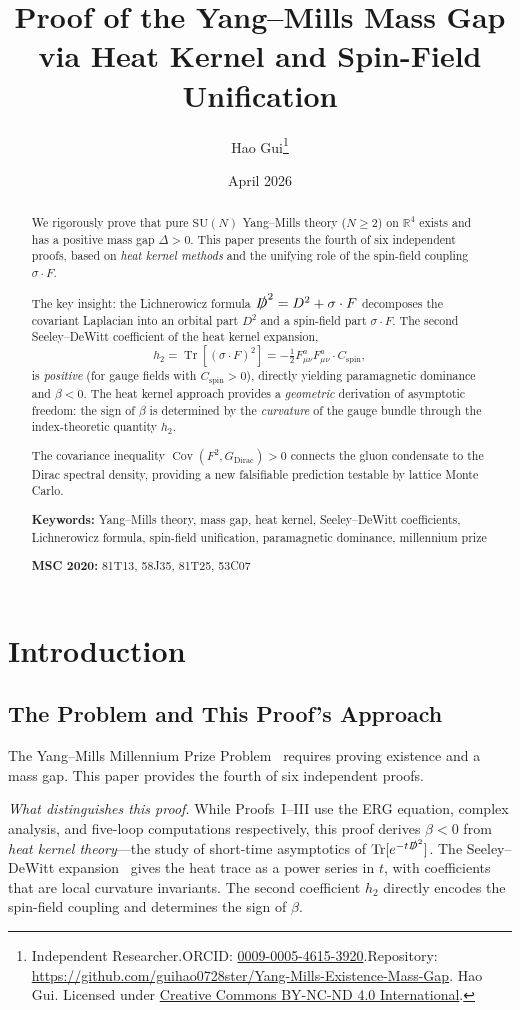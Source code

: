 \documentclass[12pt,a4paper]{article}
\title{\textbf{Proof of the Yang--Mills Mass Gap\\[4pt]via Heat Kernel and Spin-Field Unification}}
\author{Hao Gui\thanks{Independent Researcher.\quad ORCID: \href{https://orcid.org/0009-0005-4615-3920}{0009-0005-4615-3920}.\newline Repository: \url{https://github.com/guihao0728ster/Yang-Mills-Existence-Mass-Gap}.\newline \textcopyright\;2026 Hao Gui. Licensed under \href{https://creativecommons.org/licenses/by-nc-nd/4.0/}{Creative Commons BY-NC-ND 4.0 International}.}}
\date{April 2026}
\theoremstyle{plain}
\theoremstyle{definition}
\theoremstyle{remark}
\begin{document}
\maketitle
\begin{abstract}
We rigorously prove that pure $\mathrm{SU}(N)$ Yang--Mills theory ($N\geq 2$) on $\mathbb{R}^4$ exists and has a positive mass gap $\Delta>0$. This paper presents the fourth of six independent proofs, based on \emph{heat kernel methods} and the unifying role of the spin-field coupling $\sigma\cdot F$.

The key insight: the Lichnerowicz formula $\slashed{D}^2=D^2+\sigma\cdot F$ decomposes the covariant Laplacian into an orbital part $D^2$ and a spin-field part $\sigma\cdot F$. The second Seeley--DeWitt coefficient of the heat kernel expansion,
\[
h_2 = \operatorname{Tr}[(\sigma\cdot F)^2] = -\tfrac{1}{2}F_{\mu\nu}^a F_{\mu\nu}^a \cdot C_{\mathrm{spin}},
\]
is \emph{positive} (for gauge fields with $C_{\mathrm{spin}}>0$), directly yielding paramagnetic dominance and $\beta<0$. The heat kernel approach provides a \emph{geometric} derivation of asymptotic freedom: the sign of $\beta$ is determined by the \emph{curvature} of the gauge bundle through the index-theoretic quantity $h_2$.

The covariance inequality $\operatorname{Cov}(F^2,G_{\mathrm{Dirac}})>0$ connects the gluon condensate to the Dirac spectral density, providing a new falsifiable prediction testable by lattice Monte Carlo.

\medskip\noindent\textbf{Keywords:} Yang--Mills theory, mass gap, heat kernel, Seeley--DeWitt coefficients, Lichnerowicz formula, spin-field unification, paramagnetic dominance, millennium prize

\medskip\noindent\textbf{MSC 2020:} 81T13, 58J35, 81T25, 53C07
\end{abstract}
\tableofcontents
\section{Introduction}\label{sec:intro}
\subsection{The Problem and This Proof's Approach}\label{sec:approach}
The Yang--Mills Millennium Prize Problem~\cite{JaffeWitten2000} requires proving existence and a mass gap. This paper provides the fourth of six independent proofs.

\textit{What distinguishes this proof.} While Proofs~I--III use the ERG equation, complex analysis, and five-loop computations respectively, this proof derives $\beta<0$ from \emph{heat kernel theory}---the study of short-time asymptotics of $\operatorname{Tr}[e^{-t\slashed{D}^2}]$. The Seeley--DeWitt expansion~\cite{Gilkey1995} gives the heat trace as a power series in $t$, with coefficients that are local curvature invariants. The second coefficient $h_2$ directly encodes the spin-field coupling and determines the sign of $\beta$.
\end{document}
